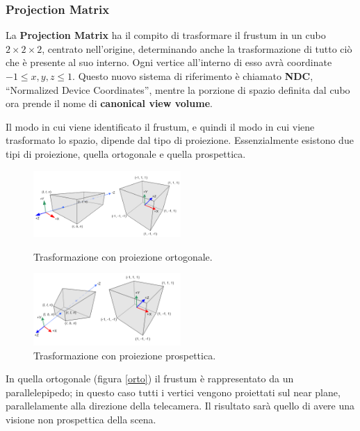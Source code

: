 \subsubsection{Projection Matrix}

%

La \textbf{Projection Matrix} ha il compito di trasformare il frustum in un cubo $2\times2\times2$, centrato nell'origine, determinando anche la trasformazione di tutto ciò che è presente al suo interno. Ogni vertice all'interno di esso avrà coordinate $-1\leq x,y,z \leq 1$. Questo nuovo sistema di riferimento è chiamato \textbf{NDC}, “Normalized Device Coordinates”, mentre la porzione di spazio definita dal cubo ora prende il nome di \textbf{canonical view volume}.

Il modo in cui viene identificato il frustum, e quindi il modo in cui viene trasformato lo spazio, dipende dal tipo di proiezione. Essenzialmente esistono due tipi di proiezione, quella ortogonale e quella prospettica.

\begin{figure}[htbp]
\centering
\includegraphics[width=0.5\textwidth]{images/frustum/orto-projection.png}
\caption{Trasformazione con proiezione ortogonale.\label{orto}}
\includegraphics[width=0.5\textwidth]{images/frustum/persp-projection.png}
\caption{Trasformazione con proiezione prospettica.\label{persp}}
\end{figure}

In quella ortogonale (figura \ref{orto}) il frustum è rappresentato da un parallelepipedo; in questo caso tutti i vertici vengono proiettati sul near plane, parallelamente alla direzione della telecamera. Il risultato sarà quello di avere una visione non prospettica della scena.

